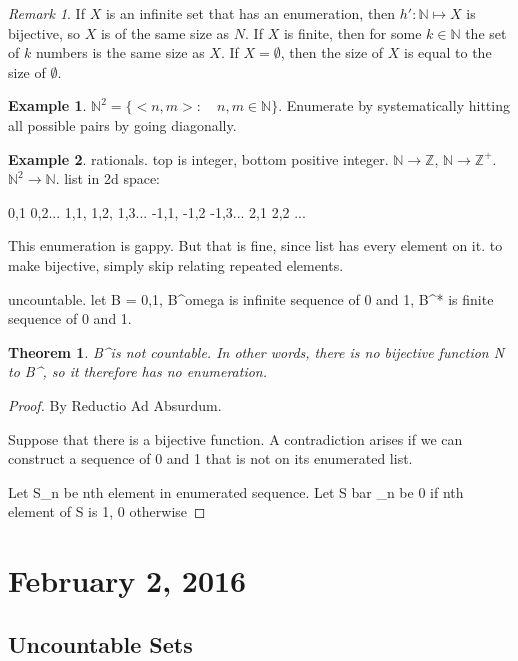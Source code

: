 \documentclass[11pt]{article}
\theoremstyle{plain} %
\newtheorem*{theorem}{Theorem}
\theoremstyle{definition}
\theoremstyle{example}
\newtheorem*{example}{Example}
\theoremstyle{remark}
\newtheorem*{remark}{Remark}
\begin{document}
\begin{remark}
If $X$ is an infinite set that has an enumeration, then $h': \mathbb N \mapsto X$ is bijective, so $X$ is of the same size as $N$.
If $X$ is finite, then for some $k \in \mathbb N$ the set of $k$ numbers is the same size as $X$.
If $X = \emptyset$, then the size of $X$ is equal to the size of $\emptyset$. 
\end{remark}

\begin{example}
$\mathbb N^2 = \{<n,m>:\quad n,m\in \mathbb N\}$. Enumerate by systematically hitting all possible pairs by going diagonally.
\end{example}

\begin{example}
rationals. top is integer, bottom positive integer. $\mathbb N \to \mathbb Z$, $\mathbb N \to \mathbb Z^+$.  $\mathbb N^2 \to \mathbb N$.
list in 2d space:

0,1	0,2...
1,1, 1,2, 1,3...
-1,1, -1,2  -1,3...
2,1	2,2	...

This enumeration is gappy. But that is fine, since list has every element on it. to make bijective, simply skip relating  repeated elements.
\end{example}

uncountable.
let B = {0,1}, B^omega  is infinite sequence of 0 and 1, B^* is finite sequence of 0 and 1.

\begin{theorem}
B^\omega is not countable. In other words, there is no bijective function N to B^\omega, so it therefore has no enumeration.
\end{theorem}

\begin{proof}
By Reductio Ad Absurdum.

Suppose that there is a bijective function. A contradiction arises if we can construct a sequence of 0 and 1 that is not on its enumerated list. 

Let S_n be nth element in enumerated sequence.
Let S bar _n be 0 if nth element of S is 1, 0 otherwise
\end{proof}

\section{February 2, 2016}
\subsection{Uncountable Sets}
\end{document}
